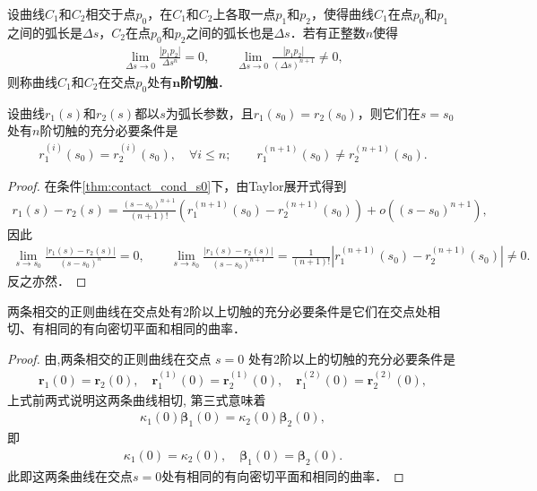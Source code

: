\documentclass[../../main.tex]{subfiles}%
\begin{document}
\begin{definition}[切触]
设曲线$C_1$和$C_2$相交于点$p_0$，在$C_1$和$C_2$上各取一点$p_1$和$p_2$，使得曲线$C_1$在点$p_0$和$p_1$之间的弧长是$\Delta s$，$C_2$在点$p_0$和$p_2$之间的弧长也是$\Delta s$．若有正整数$n$使得
\begin{align*}
\lim_{\Delta s \to 0} \frac{|p_1p_2|}{\Delta s^n} = 0,\qquad 
\lim_{\Delta s \to 0} \frac{|p_1p_2|}{(\Delta s)^{n+1}} \neq 0,
\end{align*}
则称曲线$C_1$和$C_2$在交点$p_0$处有$\bm{n}$\textbf{阶切触}．
\end{definition}

\begin{theorem}\label{theorem:微分几何-定理6.1}
设曲线$r_1(s)$和$r_2(s)$都以$s$为弧长参数，且$r_1(s_0)=r_2(s_0)$，则它们在$s=s_0$处有$n$阶切触的充分必要条件是
\begin{align}
r_1^{(i)}(s_0) = r_2^{(i)}(s_0),\quad \forall i \leqslant n;\qquad 
r_1^{(n+1)}(s_0) \neq r_2^{(n+1)}(s_0). \label{thm:contact_cond_s0}
\end{align}
\end{theorem}
\begin{proof}

在条件\eqref{thm:contact_cond_s0}下，由Taylor展开式得到
\begin{align*}
r_1(s)-r_2(s)=\frac{(s-s_0)^{n+1}}{(n+1)!}\left(r_1^{(n+1)}(s_0)-r_2^{(n+1)}(s_0)\right)+o\left((s-s_0)^{n+1}\right),
\end{align*}
因此
\begin{align*}
\lim_{s \to s_0} \frac{|r_1(s)-r_2(s)|}{(s-s_0)^n}=0,\qquad 
\lim_{s \to s_0} \frac{|r_1(s)-r_2(s)|}{(s-s_0)^{n+1}}=\frac{1}{(n+1)!}\left|r_1^{(n+1)}(s_0)-r_2^{(n+1)}(s_0)\right| \neq 0.
\end{align*}
反之亦然．

\end{proof}

\begin{corollary}
两条相交的正则曲线在交点处有$2$阶以上切触的充分必要条件是它们在交点处相切、有相同的有向密切平面和相同的曲率．
\end{corollary}
\begin{proof}

由,两条相交的正则曲线在交点 $s=0$ 处有2阶以上的切触的充分必要条件是
\begin{align*}
\bm{r}_1(0) = \bm{r}_2(0),\quad \bm{r}_1^{(1)}(0) = \bm{r}_2^{(1)}(0),\quad \bm{r}_1^{(2)}(0) = \bm{r}_2^{(2)}(0),
\end{align*}
上式前两式说明这两条曲线相切, 第三式意味着
\begin{align*}
\kappa_1(0)\bm{\beta}_1(0) = \kappa_2(0)\bm{\beta}_2(0),
\end{align*}
即
\begin{align*}
\kappa_1(0) = \kappa_2(0),\quad \bm{\beta}_1(0) = \bm{\beta}_2(0).
\end{align*}
此即这两条曲线在交点$s=0$处有相同的有向密切平面和相同的曲率．

\end{proof}
\end{document}
